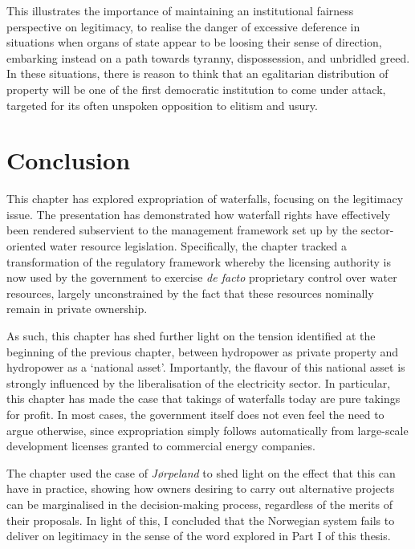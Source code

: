 {This illustrates the importance of maintaining an institutional fairness perspective on legitimacy, to realise the danger of excessive deference in situations when organs of state appear to be loosing their sense of direction, embarking instead on a path towards tyranny, dispossession, and unbridled greed. In these situations, there is reason to think that an egalitarian distribution of property will be one of the first democratic institution to come under attack, targeted for its often unspoken opposition to elitism and usury.
}
\section{Conclusion}\label{sec:5:8}

This chapter has explored expropriation of waterfalls, focusing on the legitimacy issue. The presentation has demonstrated how waterfall rights have effectively been rendered subservient to the management framework set up by the sector-oriented water resource legislation. Specifically, the chapter tracked a transformation of the regulatory framework whereby the licensing authority is now used by the government to exercise {\it de facto} proprietary control over water resources, largely unconstrained by the fact that these resources nominally remain in private ownership.

As such, this chapter has shed further light on the tension identified at the beginning of the previous chapter, between hydropower as private property and hydropower as a `national asset'. Importantly, the flavour of this national asset is strongly influenced by the liberalisation of the electricity sector. In particular, this chapter has made the case that takings of waterfalls today are pure takings for profit. In most cases, the government itself does not even feel the need to argue otherwise, since expropriation simply follows automatically from large-scale development licenses granted to commercial energy companies.

The chapter used the case of {\it Jørpeland} to shed light on the effect that this can have in practice, showing how owners desiring to carry out alternative projects can be marginalised in the decision-making process, regardless of the merits of their proposals. In light of this, I concluded that the Norwegian system fails to deliver on legitimacy in the sense of the word explored in Part I of this thesis. 

